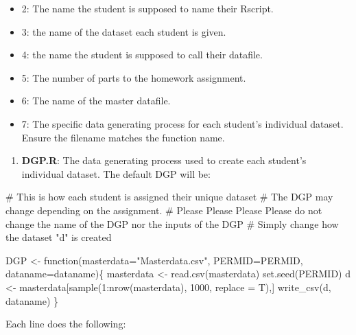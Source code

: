 \documentclass[
]{article}
\newenvironment{Shaded}{}{}
\newcommand{\CommentTok}[1]{\textcolor[rgb]{0.00,0.50,0.00}{#1}}
\newcommand{\ControlFlowTok}[1]{\textcolor[rgb]{0.00,0.00,1.00}{#1}}
\newcommand{\DataTypeTok}[1]{#1}
\newcommand{\DecValTok}[1]{#1}
\newcommand{\KeywordTok}[1]{\textcolor[rgb]{0.00,0.00,1.00}{#1}}
\newcommand{\NormalTok}[1]{#1}
\newcommand{\OperatorTok}[1]{#1}
\newcommand{\StringTok}[1]{\textcolor[rgb]{0.00,0.50,0.50}{#1}}
\providecommand{\tightlist}{%
  \setlength{\itemsep}{0pt}\setlength{\parskip}{0pt}}
\begin{document}
\begin{itemize}
\item
  2: The name the student is supposed to name their Rscript.
\item
  3: the name of the dataset each student is given.
\item
  4: the name the student is supposed to call their datafile.
\item
  5: The number of parts to the homework assignment.
\item
  6: The name of the master datafile.
\item
  7: The specific data generating process for each student's individual
  dataset. Ensure the filename matches the function name.
\end{itemize}

\begin{enumerate}
\def\labelenumi{(\arabic{enumi})}
\setcounter{enumi}{4}
\tightlist
\item
  \textbf{DGP.R}: The data generating process used to create each
  student's individual dataset. The default DGP will be:
\end{enumerate}

\hypertarget{numCode}{%
\label{numCode}}%
\begin{Shaded}
\begin{Highlighting}[numbers=left,,]
\CommentTok{# This is how each student is assigned their unique dataset}
  \CommentTok{# The DGP may change depending on the assignment. }
  \CommentTok{# Please Please Please Please do not change the name of the DGP nor the inputs of the DGP}
      \CommentTok{# Simply change how the dataset "d" is created}

\NormalTok{DGP <-}\StringTok{ }\ControlFlowTok{function}\NormalTok{(}\DataTypeTok{masterdata=}\StringTok{"Masterdata.csv"}\NormalTok{, }\DataTypeTok{PERMID=}\NormalTok{PERMID, }\DataTypeTok{dataname=}\NormalTok{dataname)\{}
\NormalTok{  masterdata <-}\StringTok{ }\KeywordTok{read.csv}\NormalTok{(masterdata)}
  \KeywordTok{set.seed}\NormalTok{(PERMID)}
\NormalTok{  d <-}\StringTok{ }\NormalTok{masterdata[}\KeywordTok{sample}\NormalTok{(}\DecValTok{1}\OperatorTok{:}\KeywordTok{nrow}\NormalTok{(masterdata), }\DecValTok{1000}\NormalTok{, }\DataTypeTok{replace =}\NormalTok{ T),]}
  \KeywordTok{write_csv}\NormalTok{(d, dataname)}
\NormalTok{\}}
\end{Highlighting}
\end{Shaded}

Each line does the following:
\end{document}
